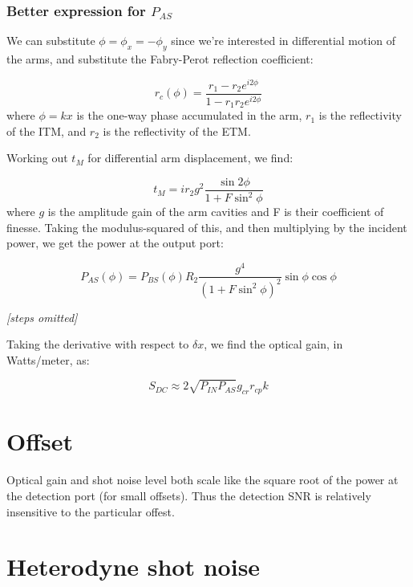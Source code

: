 \subsubsection{Better expression for $P_{AS}$}

We can substitute $\phi=\phi_{x}=-\phi_{y}$ since we're interested
in differential motion of the arms, and substitute the Fabry-Perot
reflection coefficient:

\begin{equation}
r_{c}(\phi)=\frac{r_{1}-r_{2}e^{i2\phi}}{1-r_{1}r_{2}e^{i2\phi}}\end{equation}
where $\phi=kx$ is the one-way phase accumulated in the arm, $r_{1}$
is the reflectivity of the ITM, and $r_{2}$ is the reflectivity of
the ETM.

Working out $t_{M}$ for differential arm displacement, we find:

\begin{equation}
t_{M}=ir_{2}g^{2}\frac{\sin2\phi}{1+F\sin^{2}\phi}\end{equation}
where $g$ is the amplitude gain of the arm cavities and F is their
coefficient of finesse. Taking the modulus-squared of this, and then
multiplying by the incident power, we get the power at the output
port:

\begin{equation}
P_{AS}(\phi)=P_{BS}(\phi)R_{2}\frac{g^{4}}{\left(1+F\sin^{2}\phi\right)^{2}}\sin\phi\cos\phi\end{equation}


\emph{{[}steps omitted{]}}

Taking the derivative with respect to $\delta x$, we find the optical
gain, in Watts/meter, as:

\begin{equation}
S_{DC}\approx2\sqrt{P_{IN}P_{AS}}g_{cr}r_{cp}k\label{eq:dc-readout-optical-gain}
\end{equation}

\section{Offset}

Optical gain and shot noise level both scale like the square root of
the power at the detection port (for small offsets).  Thus the
detection SNR is relatively insensitive to the particular offest.

\section{Heterodyne shot noise}

